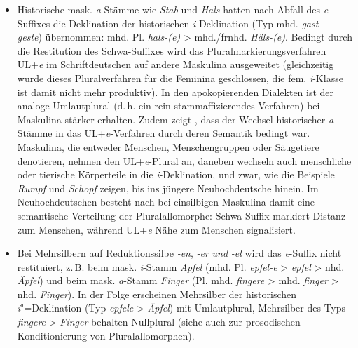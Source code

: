 \begin{itemize}\sloppy
\item Historische mask. \textit{a}{}-Stämme wie \textit{Stab} und \textit{Hals} hatten nach Abfall des \textit{e}{}-Suffixes die Deklination der historischen \textit{i}{}-Deklination (Typ mhd. \textit{gast} -- \textit{geste}) übernommen: mhd. Pl. \textit{hals-(e)} > mhd./frnhd. \textit{Häls-(e)}. Bedingt durch die Restitution des Schwa-Suffixes wird das Pluralmarkierungsverfahren UL+\textit{e} im Schriftdeutschen auf andere Maskulina ausgeweitet (gleichzeitig wurde dieses Pluralverfahren für die Feminina geschlossen, die fem. \textit{i}{}-Klasse ist damit nicht mehr produktiv). In den apokopierenden Dialekten ist der analoge Umlautplural (d.\,h. ein rein stammaffizierendes Verfahren) bei Maskulina stärker erhalten. Zudem zeigt \citet{Köpcke1994}, dass der Wechsel historischer \textit{a}{}-Stämme in das UL+\textit{e}{}-Verfahren durch deren Semantik bedingt war. Maskulina, die entweder Menschen, Menschengruppen oder Säugetiere denotieren, nehmen den UL+\textit{e}{}-Plural an, daneben wechseln auch menschliche oder tierische Körperteile in die \textit{i}{}-Deklination, und zwar, wie die Beispiele \textit{Rumpf} und \textit{Schopf} zeigen, bis ins jüngere Neuhochdeutsche hinein. Im Neuhochdeutschen besteht nach \citet[84]{Köpcke1994} bei einsilbigen Maskulina damit eine semantische Verteilung der Pluralallomorphe: Schwa-Suffix markiert Distanz zum Menschen, während UL+\textit{e} Nähe zum Menschen signalisiert.
\item Bei Mehrsilbern auf Reduktionssilbe \textit{-\textit{en}}, \textit{-\textit{er} }\textit{und} \textit{-\textit{el}} wird das \textit{e}{}-Suffix nicht restituiert, z.\,B. beim mask. \textit{i}{}-Stamm \textit{Apfel} (mhd. Pl. \textit{epfel-e} > \textit{epfel} > nhd. \textit{Äpfel}) und beim mask. \textit{a}{}-Stamm \textit{Finger} (Pl. mhd. \textit{fingere} > mhd. \textit{finger} > nhd. \textit{Finger}). In der Folge erscheinen Mehrsilber der historischen \textit{i}"=Deklination (Typ \textit{epfele} > \textit{Äpfel}) mit Umlautplural, Mehrsilber des Typs \textit{fingere} > \textit{Finger} behalten Nullplural (siehe auch  zur prosodischen Konditionierung von Pluralallomorphen).


\end{itemize}

